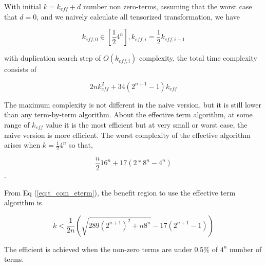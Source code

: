 \documentclass[twocolumn]{article}
\begin{document}
With initial $k = k_{eff} +d$ number non zero-terms,
assuming that the worst case that $d=0$, and we naively calculate 
all tensorized transformation, we have 

\begin{equation}
    k_{eff, 0} \in [\frac{1}{2}4^{n}], k_{eff, i} = \frac{1}{2} k_{eff, i-1}
\end{equation}

with duplication search step of $O(k_{eff, i})$ complexity,
the total time complexity consists of 

\begin{equation}
    \label{eq:t_com_eterm}
    2 n  k_{eff}^2 + 34 (2^{n+1} -1) k_{eff}
\end{equation} 

The maximum complexity is not different in the naive version, but it is still
lower than any term-by-term algorithm. About the effective term algorithm,
at some range of $k_{eff}$ value it is the most efficient but 
at very small or worst case, the naive version is more efficient. 
The worst complexity of the effective algorithm arises 
when $k=\frac{1}{2}4^n$ so that,

\begin{equation}
    \frac{n}{2} 16^n + 17 (2 * 8^n - 4^n) 
\end{equation}.

From Eq (\ref{eq:t_com_eterm}), the benefit region to use 
the effective term algorithm is 

\begin{equation}
    k < \frac{1}{2n} \left(\sqrt{289(2^{n+1})^2 + n 8^n} - 17 (2^{n+1} -1) \right) 
\end{equation}

The efficient is achieved when the non-zero terms are under 0.5\% of $4^n$ number of terms.
\end{document}
